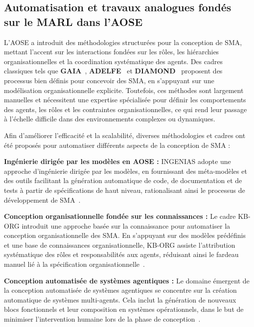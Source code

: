 \documentclass[pdflatex,sn-mathphys-num]{sn-jnl}%
\theoremstyle{thmstyleone}%
\theoremstyle{thmstyletwo}%
\theoremstyle{thmstylethree}%
\begin{document}
\subsection{Automatisation et travaux analogues fondés sur le MARL dans l'AOSE}\label{sub-sec:rel_aose_automate_marl}

L'AOSE a introduit des méthodologies structurées pour la conception de SMA, mettant l'accent sur les interactions fondées sur les rôles, les hiérarchies organisationnelles et la coordination systématique des agents. Des cadres classiques tels que \textbf{GAIA}~\cite{gaia1998}, \textbf{ADELFE}~\cite{adelfe2002} et \textbf{DIAMOND}~\cite{Jamont2005} proposent des processus bien définis pour concevoir des SMA, en s'appuyant sur une modélisation organisationnelle explicite. Toutefois, ces méthodes sont largement manuelles et nécessitent une expertise spécialisée pour définir les comportements des agents, les rôles et les contraintes organisationnelles, ce qui rend leur passage à l'échelle difficile dans des environnements complexes ou dynamiques.

Afin d'améliorer l'efficacité et la scalabilité, diverses méthodologies et cadres ont été proposés pour automatiser différents aspects de la conception de SMA :

\textbf{Ingénierie dirigée par les modèles en AOSE :} INGENIAS adopte une approche d'ingénierie dirigée par les modèles, en fournissant des méta-modèles et des outils facilitant la génération automatique de code, de documentation et de tests à partir de spécifications de haut niveau, rationalisant ainsi le processus de développement de SMA~\cite{pavon2005agent}.

\textbf{Conception organisationnelle fondée sur les connaissances :} Le cadre KB-ORG introduit une approche basée sur la connaissance pour automatiser la conception organisationnelle des SMA. En s'appuyant sur des modèles prédéfinis et une base de connaissances organisationnelle, KB-ORG assiste l'attribution systématique des rôles et responsabilités aux agents, réduisant ainsi le fardeau manuel lié à la spécification organisationnelle~\cite{dignum2001kb}.

\textbf{Conception automatisée de systèmes agentiques :} Le domaine émergent de la conception automatisée de systèmes agentiques se concentre sur la création automatique de systèmes multi-agents. Cela inclut la génération de nouveaux blocs fonctionnels et leur composition en systèmes opérationnels, dans le but de minimiser l'intervention humaine lors de la phase de conception~\cite{smith2024automated}.
\end{document}
